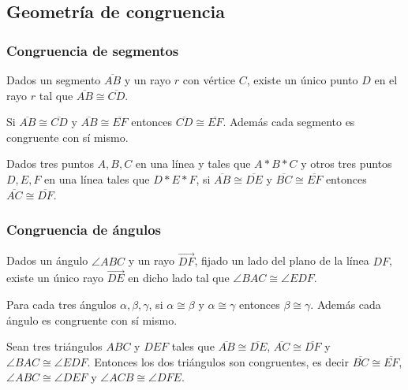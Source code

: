 \subsection{Geometría de congruencia}

\subsubsection{Congruencia de segmentos}

\begin{ax}\label{C1}
	Dados un segmento $\overline{AB}$ y un rayo $r$ con vértice $C$, existe un
	único punto $D$ en el rayo $r$ tal que $\overline{AB}\cong\overline{CD}$.
\end{ax}

\begin{ax}\label{C2}
	Si $\overline{AB}\cong\overline{CD}$ y $\overline{AB}\cong\overline{EF}$
	entonces $\overline{CD}\cong\overline{EF}$. Además cada segmento es
	congruente con sí mismo.
\end{ax}

\begin{ax}[Suma]\label{C3}
	Dados tres puntos $A, B, C$ en una línea y tales que $A * B * C$ y otros
	tres puntos $D, E, F$ en una línea tales que $D * E * F$, si
	$\overline{AB}\cong\overline{DE}$ y $\overline{BC}\cong\overline{EF}$
	entonces $\overline{AC}\cong\overline{DF}$.
\end{ax}

\subsubsection{Congruencia de ángulos}

\begin{ax}\label{C4}
	Dados un ángulo $\angle ABC$ y un rayo $\overrightarrow{DF}$, fijado un lado
	del plano de la línea $DF$, existe un único rayo $\overrightarrow{DE}$ en
	dicho lado tal que $\angle BAC\cong\angle EDF$.
\end{ax}

\begin{ax}\label{C5}
	Para cada tres ángulos $\alpha, \beta, \gamma$, si $\alpha\cong\beta$ y
	$\alpha\cong\gamma$ entonces $\beta\cong\gamma$. Además cada ángulo es
	congruente con sí mismo.
\end{ax}

\begin{ax}[SAS]\label{C6}
	Sean tres triángulos $ABC$ y $DEF$ tales que
	$\overline{AB}\cong\overline{DE}$, $\overline{AC}\cong\overline{DF}$ y
	$\angle BAC\cong\angle EDF$. Entonces los dos triángulos son congruentes, es
	decir $\overline{BC}\cong\overline{EF}$, $\angle ABC\cong\angle DEF$ y
	$\angle ACB\cong\angle DFE$.
\end{ax}



